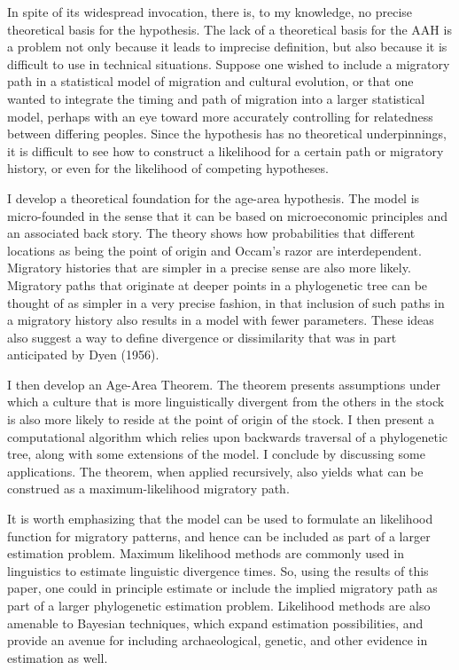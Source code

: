 \documentclass[11pt]{article}
\begin{document}
In spite of its widespread invocation, there is, to my knowledge, no precise theoretical basis for the hypothesis. The lack of a theoretical basis for the  AAH is a problem not only because it leads to imprecise definition, but also because it is difficult to use in technical situations. Suppose one wished to include a migratory path in a statistical model of migration and cultural evolution, or that one wanted to integrate the timing and path of migration into a larger statistical model, perhaps with an eye toward more accurately controlling for relatedness between differing peoples. Since the hypothesis has no theoretical underpinnings, it is difficult to see how to construct a likelihood for a certain path or migratory history, or even for the likelihood of competing hypotheses.

I develop a theoretical foundation for the age-area hypothesis. The model is micro-founded in the sense that it can be based on microeconomic principles and an associated back story. The theory shows how probabilities that different locations as being the point of origin and Occam's razor are interdependent. Migratory histories that are simpler in a precise sense are also more likely. Migratory paths that originate at deeper points in a phylogenetic tree can be thought of as simpler in a very precise fashion, in that inclusion of such paths in a migratory history also results in a model with fewer parameters. These ideas also suggest a way to define divergence or dissimilarity that was in part anticipated by Dyen (1956). 

I then develop an Age-Area Theorem. The theorem presents assumptions under which a culture that is more linguistically divergent from the others in the stock is also more likely to reside at the point of origin of the stock. I then present a computational algorithm which relies upon backwards traversal of a phylogenetic tree, along with some extensions of the model. I conclude by discussing some applications. The theorem, when applied recursively, also yields what can be construed as a maximum-likelihood migratory path. 

It is worth emphasizing that the model can be used to formulate an likelihood function for migratory patterns, and hence can be included as part of a larger estimation problem. Maximum likelihood methods are commonly used in linguistics to estimate linguistic divergence times. So, using the results of this paper, one could in principle estimate or include the implied migratory path as part of a larger phylogenetic estimation problem. Likelihood methods are also amenable to Bayesian techniques, which expand estimation possibilities, and provide an avenue for including archaeological, genetic, and other evidence in estimation as well. 
\end{document}
